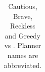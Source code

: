 \begin{table}[tb]
{\begin{tabular}{|l||ccccc||ccccc||ccccc||ccccc||}
        \end{tabular}}
        \caption{Cautious, Brave, Reckless and Greedy \pattyd vs \pattyo. Planner names are abbreviated.}
        \label{tab:cbrg}
        \end{table}
        